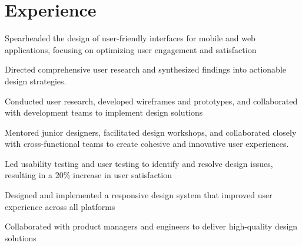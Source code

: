 \documentclass[letterpaper]{resume} %
\begin{document}
\hfill
%
%
\begin{minipage}[t]{0.66\textwidth} %


\section{Experience}


\vspace{\topsep} %
\begin{tightitemize}
\item Spearheaded the design of user-friendly interfaces for mobile and web applications, focusing on optimizing user engagement and satisfaction
\item Directed comprehensive user research and synthesized findings into actionable design strategies.
\item Conducted user research, developed wireframes and prototypes, and collaborated with development teams to implement design solutions
\item Mentored junior designers, facilitated design workshops, and collaborated closely with cross-functional teams to create cohesive and innovative user experiences.
\item Led usability testing and user testing to identify and resolve design issues, resulting in a 20\% increase in user satisfaction
\item Designed and implemented a responsive design system that improved user experience across all platforms
\item Collaborated with product managers and engineers to deliver high-quality design solutions
\end{tightitemize}

\sectionspace %




\end{minipage}
\end{document}

